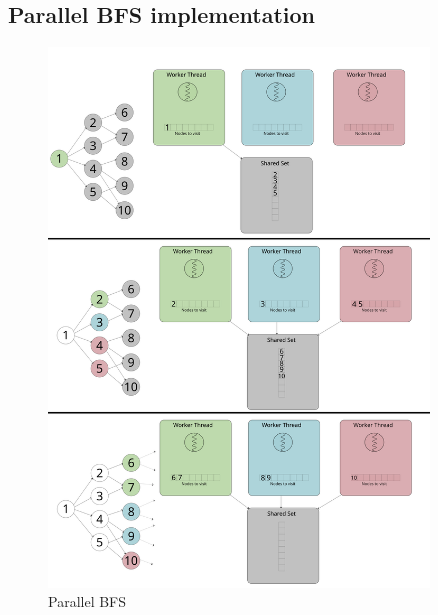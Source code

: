 \subsection{Parallel BFS implementation}
\begin{figure}[ht]
    \centering
    \includegraphics[width=0.9\textwidth]{figures/parallelBFS.png}
    \caption{Parallel BFS}
    \label{fig:parallelBFS}
\end{figure}
